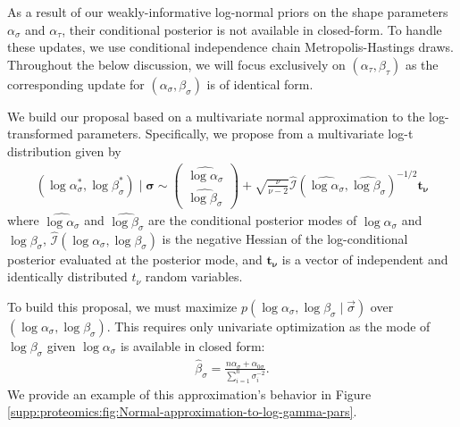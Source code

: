 As a result of our weakly-informative log-normal priors on the shape parameters $\alpha_\sigma$ and $\alpha_\tau$, their conditional posterior is not available in closed-form.
To handle these updates, we use conditional independence chain Metropolis-Hastings draws.
Throughout the below discussion, we will focus exclusively on $(\alpha_\tau, \beta_\tau)$ as the corresponding update for $(\alpha_\sigma, \beta_\sigma)$ is of identical form.

We build our proposal based on a multivariate normal approximation to the log-transformed parameters.
Specifically, we propose from a multivariate log-t distribution given by
\begin{eqnarray}
(\log \alpha_{\sigma}^*, \log \beta_{\sigma}^*) \mid \bm{\sigma} \sim \left(\begin{array}{c}
\widehat{\log\alpha_{\sigma}} \\
\widehat{\log\beta_{\sigma}}
\end{array}\right) +
\sqrt{\frac{\nu}{\nu - 2}} \hat{\mathcal{I}}(\widehat{\log\alpha_{\sigma}},\widehat{\log\beta_{\sigma}})^{-1/2} \bm{t_{\nu}} \label{supp:proteomics:eqn:alpha_and_beta_sigma_multivar_log_normal_prop}
\end{eqnarray}
where $\widehat{\log\alpha_{\sigma}}$ and $\widehat{\log\beta_{\sigma}}$ are the conditional posterior modes of $\log\alpha_{\sigma}$ and $\log\beta_\sigma$, $\hat{\mathcal{I}}(\log\alpha_\sigma,\log\beta_\sigma)$ is the negative Hessian of the log-conditional posterior evaluated at the posterior mode, and $\bm{t_{\nu}}$ is a vector of independent and identically distributed $t_{\nu}$ random variables.

To build this proposal, we must maximize $p(\log \alpha_{\sigma}, \log \beta_{\sigma} \mid \vec{\sigma})$ over $(\log \alpha_{\sigma}, \log \beta_{\sigma})$.
This requires only univariate optimization as the mode of $\log \beta_\sigma$ given $\log \alpha_\sigma$ is available in closed form:
\begin{eqnarray}
\hat{\beta}_{\sigma} = \frac{n\alpha_{\sigma} + \alpha_{0 \sigma}}{\sum_{i=1}^{n}\sigma_{i}^{-2}} .
\end{eqnarray}
We provide an example of this approximation's behavior in Figure \ref{supp:proteomics:fig:Normal-approximation-to-log-gamma-pars}.

